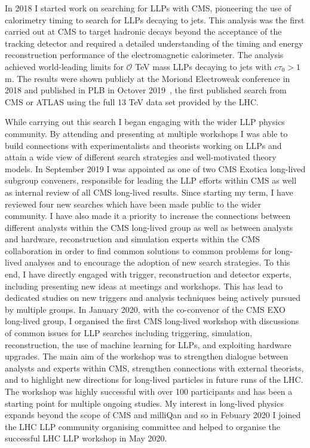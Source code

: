\documentclass[11pt]{article}
\theoremstyle{plain} \numberwithin{equation}{section}
\theoremstyle{definition}
\newcounter{list}
\begin{document}
In 2018 I started work on searching for LLPs with CMS, 
pioneering the use of calorimetry timing to search for LLPs decaying to jets. This analysis was the first carried 
out at CMS to target hadronic decays beyond the acceptance of the tracking detector and required a detailed
understanding of the timing and energy reconstruction performance of the electromagnetic calorimeter. The analysis achieved 
world-leading limits for $\mathcal{O}$ TeV mass LLPs decaying to jets with $c\tau_{0} > 1$ m. 
The results were shown publicly at the Moriond Electroweak conference in 2018 and published in PLB in Octover 2019~\cite{2019134876}, 
the first published search from CMS or ATLAS using the full 13 TeV data set provided by the LHC. 

While carrying out this search I began engaging with the wider LLP physics community. 
By attending and presenting at multiple workshops I was able to build connections with 
experimentalists and theorists working on LLPs and attain a wide view of different 
search strategies and well-motivated theory models. In September 2019 I was appointed as
one of two CMS Exotica long-lived subgroup conveners, responsible for leading the 
LLP efforts within CMS as well as internal review of all CMS long-lived results. Since starting
my term, I have reviewed four new searches which have been made public to the wider community.
I have also made it a priority to increase the connections between different analysts within the
CMS long-lived group as well as between analysts and hardware, reconstruction 
and simulation experts within the CMS collaboration in order to find common solutions to 
common problems for long-lived analyses and to encourage the
adoption of new search strategies. To this end, I have directly engaged with
trigger, reconstruction and detector experts, including presenting new ideas at
meetings and workshops. This has lead to dedicated studies on new triggers and 
analysis techniques being actively pursued by multiple groups. 
In January 2020, with the co-convenor of the CMS EXO long-lived group, I 
organised the first CMS long-lived workshop with discussions 
of common issues for LLP searches including triggering, simulation, reconstruction, 
the use of machine learning for LLPs, and exploiting hardware upgrades. 
The main aim of the workshop was to strengthen dialogue between analysts and experts within CMS,
strengthen connections with external theorists, and to highlight new directions 
for long-lived particles in future runs of the LHC.  
The workshop was highly successful with over 100 participants and has been a starting 
point for multiple ongoing studies. My interest in long-lived physics expands beyond the scope of CMS
and milliQan and so in Febuary 2020 I joined the LHC LLP community organising committee 
and helped to organise the successful LHC LLP workshop in May 2020.
\end{document}
